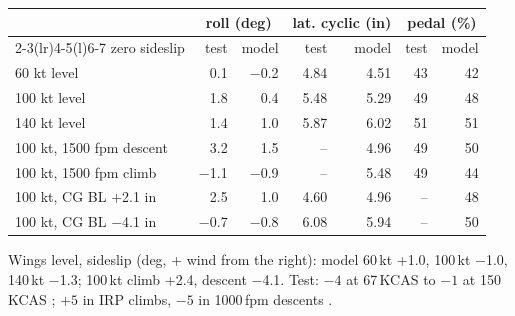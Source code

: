 \begin{tabular}{@{}lrrrrrr@{}}
\toprule
 & \multicolumn{2}{c}{roll (deg)} & \multicolumn{2}{c}{lat. cyclic (in)} & \multicolumn{2}{c}{pedal (\%)} \\
\cmidrule(lr){2-3}\cmidrule(lr){4-5}\cmidrule(l){6-7}
zero sideslip & test & model & test & model & test & model \\
\midrule
60 kt level & 0.1 & $-$0.2 & 4.84 & 4.51 & 43 & 42 \\
100 kt level & 1.8 & 0.4 & 5.48 & 5.29 & 49 & 48 \\
140 kt level & 1.4 & 1.0 & 5.87 & 6.02 & 51 & 51 \\
100 kt, 1500 fpm descent & 3.2 & 1.5 & -- & 4.96 & 49 & 50 \\
100 kt, 1500 fpm climb & $-$1.1 & $-$0.9 & -- & 5.48 & 49 & 44 \\
100 kt, CG BL +2.1 in & 2.5 & 1.0 & 4.60 & 4.96 & -- & 48 \\
100 kt, CG BL $-$4.1 in & $-$0.7 & $-$0.8 & 6.08 & 5.94 & -- & 50 \\
\bottomrule
\end{tabular}

\smallskip\footnotesize
Wings level, sideslip (deg, + wind from the right): model 60\,kt +1.0, 100\,kt $-$1.0, 140\,kt $-$1.3; 100\,kt climb +2.4, descent $-$4.1. Test: $-4$ at 67\,KCAS to $-1$ at 150\,KCAS \cite{a7924}; $+5$ in IRP climbs, $-5$ in 1000\,fpm descents \cite{a85}.
